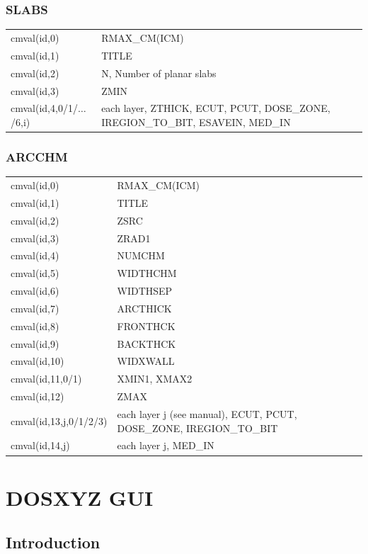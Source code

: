 \documentclass[12pt]{book}
\begin{document}
\subsection{SLABS}

\begin{tabular}{|p{4.5cm}|p{11.5cm}|}\hline
cmval(id,0) &  RMAX\_CM(ICM)\\
cmval(id,1) &  TITLE \\
cmval(id,2) &  N,  Number of planar slabs\\
cmval(id,3) &  ZMIN \\
cmval(id,4,0/1/$\ldots$/6,i) & each layer, ZTHICK, ECUT, PCUT, DOSE\_ZONE,
IREGION\_TO\_BIT, ESAVEIN, MED\_IN    \\\hline
\end{tabular}

\subsection{ARCCHM}

\begin{tabular}{|p{4.5cm}|p{11.5cm}|}\hline
cmval(id,0) &  RMAX\_CM(ICM) \\
cmval(id,1) &  TITLE \\
cmval(id,2) &  ZSRC \\
cmval(id,3) &  ZRAD1 \\
cmval(id,4) &  NUMCHM \\
cmval(id,5) &  WIDTHCHM \\
cmval(id,6) &  WIDTHSEP \\
cmval(id,7) &  ARCTHICK \\
cmval(id,8) &  FRONTHCK \\
cmval(id,9) &  BACKTHCK \\
cmval(id,10) &  WIDXWALL \\
cmval(id,11,0/1) &  XMIN1, XMAX2 \\
cmval(id,12) &  ZMAX \\
cmval(id,13,j,0/1/2/3) &  each layer j (see manual), ECUT, PCUT, DOSE\_ZONE, IREGION\_TO\_BIT\\
cmval(id,14,j) &  each layer j, MED\_IN \\ \hline
\end{tabular}


\chapter{DOSXYZ GUI}

{\sffamily
\section{Introduction}
}
\end{document}
